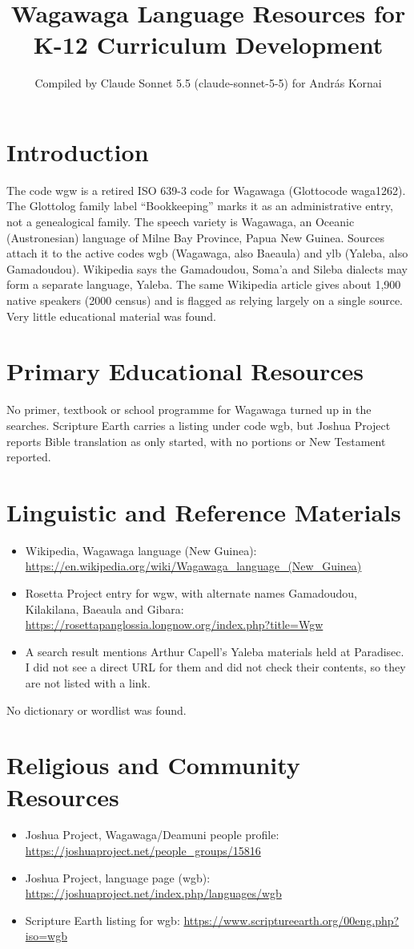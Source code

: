 \documentclass[12pt]{article}
\title{Wagawaga Language Resources for K-12 Curriculum Development}
\author{Compiled by Claude Sonnet 5.5 (claude-sonnet-5-5) for Andr\'as Kornai}
\date{}
\begin{document}
\maketitle

\section{Introduction}
The code wgw is a retired ISO 639-3 code for Wagawaga (Glottocode waga1262). The Glottolog family label ``Bookkeeping'' marks it as an administrative entry, not a genealogical family. The speech variety is Wagawaga, an Oceanic (Austronesian) language of Milne Bay Province, Papua New Guinea. Sources attach it to the active codes wgb (Wagawaga, also Baeaula) and ylb (Yaleba, also Gamadoudou). Wikipedia says the Gamadoudou, Soma'a and Sileba dialects may form a separate language, Yaleba. The same Wikipedia article gives about 1,900 native speakers (2000 census) and is flagged as relying largely on a single source. Very little educational material was found.

\section{Primary Educational Resources}
No primer, textbook or school programme for Wagawaga turned up in the searches. Scripture Earth carries a listing under code wgb, but Joshua Project reports Bible translation as only started, with no portions or New Testament reported.

\section{Linguistic and Reference Materials}
\begin{itemize}
\item Wikipedia, Wagawaga language (New Guinea): \url{https://en.wikipedia.org/wiki/Wagawaga_language_(New_Guinea)}
\item Rosetta Project entry for wgw, with alternate names Gamadoudou, Kilakilana, Baeaula and Gibara: \url{https://rosettapanglossia.longnow.org/index.php?title=Wgw}
\item A search result mentions Arthur Capell's Yaleba materials held at Paradisec. I did not see a direct URL for them and did not check their contents, so they are not listed with a link.
\end{itemize}
No dictionary or wordlist was found.

\section{Religious and Community Resources}
\begin{itemize}
\item Joshua Project, Wagawaga/Deamuni people profile: \url{https://joshuaproject.net/people_groups/15816}
\item Joshua Project, language page (wgb): \url{https://joshuaproject.net/index.php/languages/wgb}
\item Scripture Earth listing for wgb: \url{https://www.scriptureearth.org/00eng.php?iso=wgb}
\end{itemize}
\end{document}
